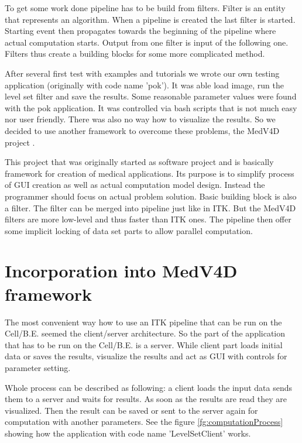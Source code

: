 \par
To get some work done pipeline has to be build from filters.
Filter is an entity that represents an algorithm.
When a pipeline is created the last filter is started.
Starting event then propagates towards the beginning of the pipeline where actual computation starts.
Output from one filter is input of the following one.
Filters thus create a building blocks for some more complicated method.

\par
After several first test with examples and tutorials we wrote our own testing application (originally with code name 'pok').
It was able load image, run the level set filter and save the results.
Some reasonable parameter values were found with the pok application.
It was controlled via bash scripts that is not much easy nor user friendly.
There was also no way how to visualize the results.
So we decided to use another framework to overcome these problems, the MedV4D project \cite{medved}.

\par
This project that was originally started as software project and is basically framework for creation of medical applications.
Its purpose is to simplify process of GUI creation as well as actual computation model design.
Instead the programmer should focus on actual problem solution.
Basic building block is also a filter.
The filter can be merged into pipeline just like in ITK.
But the MedV4D filters are more low-level and thus faster than ITK ones.
The pipeline then offer some implicit locking of data set parts to allow parallel computation.

\section{Incorporation into MedV4D framework}

\par
The most convenient way how to use an ITK pipeline that can be run on the \mbox{Cell/B.E.} seemed the client/server architecture.
So the part of the application that has to be run on the \mbox{Cell/B.E.} is a server.
While client part loads initial data or saves the results, visualize the results and act as GUI with controls for parameter setting.

\par
Whole process can be described as following: a client loads the input data sends them to a server and waits for results.
As soon as the results are read they are visualized.
Then the result can be saved or sent to the server again for computation with another parameters.
See the figure \ref{fg:computationProcess} showing how the application with code name 'LevelSetClient' works.

